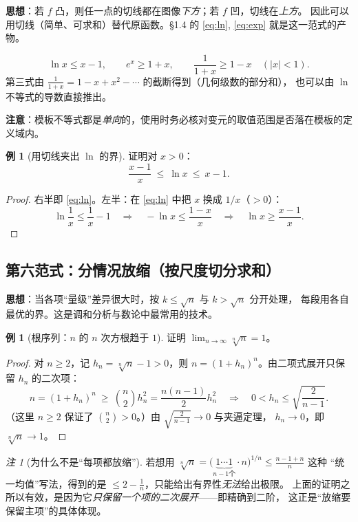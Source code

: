 \documentclass[11pt,a4paper]{ctexart}
\theoremstyle{definition}
\newtheorem{example}[theorem]{例}
\theoremstyle{remark}
\newtheorem*{remark}{注}
\newcommand{\abs}[1]{\left\lvert #1 \right\rvert}
\begin{document}
\textbf{思想}：若 $f$ 凸，则任一点的切线都在图像\emph{下方}；若 $f$ 凹，切线在\emph{上方}。
因此可以用切线（简单、可求和）替代原函数。\S 1.4 的 \eqref{eq:ln}, \eqref{eq:exp} 就是这一范式的产物。

\begin{keybox}[切线放缩的三个常用模板]
\[
  \ln x\le x-1,\qquad e^{x}\ge1+x,\qquad
  \frac{1}{1+x}\ge 1-x\quad(\abs x<1).
\]
第三式由 $\frac{1}{1+x}=1-x+x^2-\cdots$ 的截断得到（几何级数的部分和），
也可以由 $\ln$ 不等式的导数直接推出。\par\smallskip
\textbf{注意}：模板不等式都是\emph{单向}的，使用时务必核对变元的取值范围是否落在模板的定义域内。
\end{keybox}

\begin{example}[用切线夹出 $\ln$ 的界]
证明对 $x>0$：
\[
  \frac{x-1}{x}\ \le\ \ln x\ \le\ x-1 .
\]
\end{example}

\begin{proof}
右半即 \eqref{eq:ln}。左半：在 \eqref{eq:ln} 中把 $x$ 换成 $1/x$（$>0$）：
\[
  \ln\frac1x\le\frac1x-1\quad\Longrightarrow\quad-\ln x\le\frac{1-x}{x}
  \quad\Longrightarrow\quad \ln x\ge\frac{x-1}{x}.
\]
\end{proof}

\subsection{第六范式：分情况放缩（按尺度切分求和）}

\textbf{思想}：当各项“量级”差异很大时，按 $k\le\sqrt n$ 与 $k>\sqrt n$ 分开处理，
每段用各自最优的界。这是调和分析与数论中最常用的技术。

\begin{example}[根序列：$n$ 的 $n$ 次方根趋于 $1$]
证明 $\lim_{n\to\infty}\sqrt[n]{n}=1$。
\end{example}

\begin{proof}
对 $n\ge2$，记 $h_n=\sqrt[n]n-1>0$，则 $n=(1+h_n)^{n}$。由二项式展开只保留
$h_n$ 的二次项：
\[
  n=(1+h_n)^{n}\ \ge\ \binom n2 h_n^{2}=\frac{n(n-1)}{2}h_n^{2}
  \quad\Longrightarrow\quad
  0<h_n\le\sqrt{\frac{2}{n-1}} .
\]
（这里 $n\ge2$ 保证了 $\binom n2>0$。）由 $\sqrt{\frac{2}{n-1}}\to0$ 与夹逼定理，
$h_n\to0$，即 $\sqrt[n]n\to1$。
\end{proof}

\begin{remark}[为什么不是“每项都放缩”]
若想用 $\sqrt[n]n=\big(\underbrace{1\cdots1}_{n-1个}\cdot n\big)^{1/n}\le\frac{n-1+n}{n}$ 这种
“统一均值”写法，得到的是 $\le 2-\frac1n$，只能给出有界性\emph{无法}给出极限。
上面的证明之所以有效，是因为它\emph{只保留一个项的二次展开}——即精确到二阶，
这正是“放缩要保留主项”的具体体现。
\end{remark}
\end{document}
